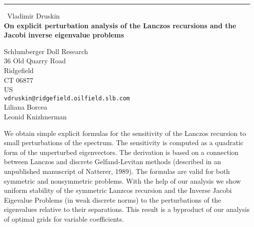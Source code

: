 \documentclass{report}
\begin{document}
\begin{center}
\rule{6in}{1pt} \
{\large Vladimir Druskin \\
{\bf On explicit perturbation analysis of the Lanczos recursions and the Jacobi inverse eigenvalue problems}}

Schlumberger Doll Research \\ 36 Old Quarry Road                   \\ Ridgefield \\ CT 06877 \\ US
\\
{\tt vdruskin@ridgefield.oilfield.slb.com}\\
Liliana Borcea\\
Leonid Knizhnerman\end{center}

We obtain simple explicit formulas for the sensitivity of the Lanczos
recursion to small perturbations of the spectrum. The sensitivity is
computed as a quadratic form of the unperturbed eigenvectors. The
derivation is based on a connection between Lanczos and discrete
Gelfand-Levitan methods (described in an unpublished manuscript of
Natterer, 1989). The formulas are valid for both symmetric and
nonsymmetric problems. With the help of our analysis we show
uniform stability of the symmetric Lanzcos recursion and the Inverse Jacobi
Eigevalue Problems (in weak discrete norms) to the
perturbations of the eigenvalues relative to their separations.
This result is a byproduct of our analysis of optimal grids for variable coefficients.
\end{document}
